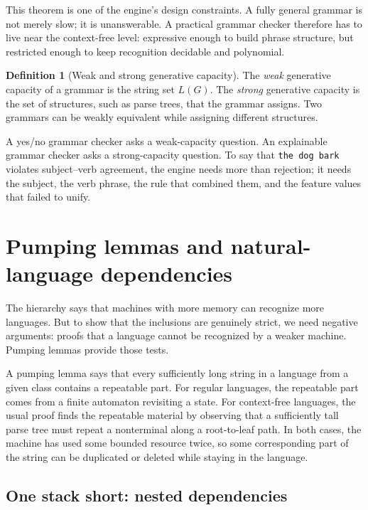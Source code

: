 \documentclass[11pt]{article}
\theoremstyle{definition}
\newtheorem{definition}{Definition}[section]
\theoremstyle{plain}
\theoremstyle{remark}
\begin{document}
This theorem is one of the engine's design constraints. A fully general grammar is not merely
slow; it is unanswerable. A practical grammar checker therefore has to live near the
context-free level: expressive enough to build phrase structure, but restricted enough to
keep recognition decidable and polynomial.

\begin{definition}[Weak and strong generative capacity]
The \emph{weak} generative capacity of a grammar is the string set $L(G)$. The \emph{strong}
generative capacity is the set of structures, such as parse trees, that the grammar assigns.
Two grammars can be weakly equivalent while assigning different structures.
\end{definition}

A yes/no grammar checker asks a weak-capacity question. An explainable grammar checker asks a
strong-capacity question. To say that \texttt{the dog bark} violates subject--verb agreement,
the engine needs more than rejection; it needs the subject, the verb phrase, the rule that
combined them, and the feature values that failed to unify.

\section{Pumping lemmas and natural-language dependencies}
\label{sec:pumping}

The hierarchy says that machines with more memory can recognize more languages. But to show
that the inclusions are genuinely strict, we need negative arguments: proofs that a language
cannot be recognized by a weaker machine. Pumping lemmas provide those tests.

A pumping lemma says that every sufficiently long string in a language from a given class
contains a repeatable part. For regular languages, the repeatable part comes from a finite
automaton revisiting a state. For context-free languages, the usual proof finds the repeatable
material by observing that a sufficiently tall parse tree must repeat a nonterminal along a
root-to-leaf path. In both cases, the machine has used some bounded resource twice, so some
corresponding part of the string can be duplicated or deleted while staying in the language.

\subsection{One stack short: nested dependencies}
\end{document}
